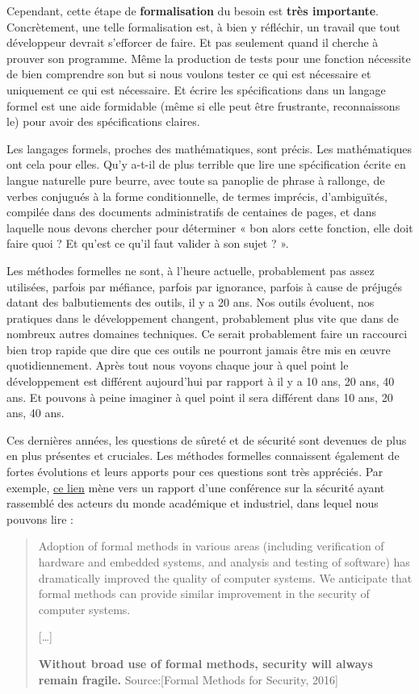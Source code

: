 \documentclass[12pt,francais,]{scrbook}
\begin{document}
Cependant, cette étape de \textbf{formalisation} du besoin est
\textbf{très importante}. Concrètement, une telle formalisation est, à
bien y réfléchir, un travail que tout développeur devrait s'efforcer de
faire. Et pas seulement quand il cherche à prouver son programme. Même
la production de tests pour une fonction nécessite de bien comprendre
son but si nous voulons tester ce qui est nécessaire et uniquement ce
qui est nécessaire. Et écrire les spécifications dans un langage formel
est une aide formidable (même si elle peut être frustrante,
reconnaissons le) pour avoir des spécifications claires.

Les langages formels, proches des mathématiques, sont précis. Les
mathématiques ont cela pour elles. Qu'y a-t-il de plus terrible que lire
une spécification écrite en langue naturelle pure beurre, avec toute sa
panoplie de phrase à rallonge, de verbes conjugués à la forme
conditionnelle, de termes imprécis, d'ambiguïtés, compilée dans des
documents administratifs de centaines de pages, et dans laquelle nous
devons chercher pour déterminer « bon alors cette fonction, elle doit
faire quoi ? Et qu'est ce qu'il faut valider à son sujet ? ».

Les méthodes formelles ne sont, à l'heure actuelle, probablement pas
assez utilisées, parfois par méfiance, parfois par ignorance, parfois à
cause de préjugés datant des balbutiements des outils, il y a 20 ans.
Nos outils évoluent, nos pratiques dans le développement changent,
probablement plus vite que dans de nombreux autres domaines techniques.
Ce serait probablement faire un raccourci bien trop rapide que dire que
ces outils ne pourront jamais être mis en œuvre quotidiennement. Après
tout nous voyons chaque jour à quel point le développement est différent
aujourd'hui par rapport à il y a 10 ans, 20 ans, 40 ans. Et pouvons à
peine imaginer à quel point il sera différent dans 10 ans, 20 ans, 40
ans.

Ces dernières années, les questions de sûreté et de sécurité sont
devenues de plus en plus présentes et cruciales. Les méthodes formelles
connaissent également de fortes évolutions et leurs apports pour ces
questions sont très appréciés. Par exemple,
\href{http://sfm.seas.harvard.edu/report.html}{ce lien} mène vers un
rapport d'une conférence sur la sécurité ayant rassemblé des acteurs du
monde académique et industriel, dans lequel nous pouvons lire :

\begin{quote}
Adoption of formal methods in various areas (including verification of
hardware and embedded systems, and analysis and testing of software) has
dramatically improved the quality of computer systems. We anticipate
that formal methods can provide similar improvement in the security of
computer systems.

{[}\ldots{}{]}

\textbf{Without broad use of formal methods, security will always remain
fragile.} Source:{[}Formal Methods for Security, 2016{]}
\end{quote}
\end{document}
